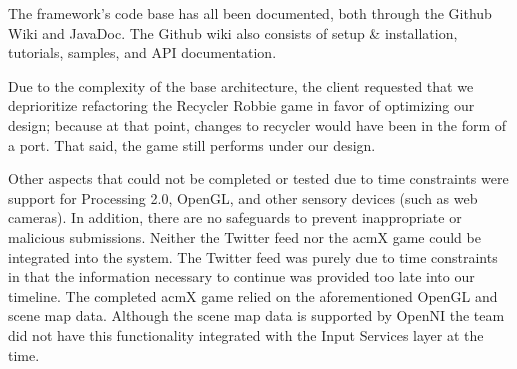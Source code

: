 \documentclass[11pt,letterpaper]{article}
\begin{document}
	The framework's code base has all been documented, both through the Github 
	Wiki and JavaDoc. The Github wiki also consists of setup \& installation, 
	tutorials, samples, and API documentation.

	Due to the complexity of the base architecture, the client requested that 
	we deprioritize refactoring the Recycler Robbie game in favor of 
	optimizing our design; because at that point, changes to recycler would 
	have been in the form of a port. That said, the game still performs under 
	our design. 

	Other aspects that could not be completed or tested due to time 
	constraints were support for Processing 2.0, OpenGL, and other sensory 
	devices (such as web cameras). In addition, there are no safeguards to prevent 
	inappropriate or malicious submissions. Neither the Twitter feed nor the 
	acmX game could be integrated into the system. The Twitter feed was purely 
	due to time constraints in that the information necessary to continue was 
	provided too late into our timeline. The completed acmX game relied on the
	aforementioned OpenGL and scene map data.  Although the scene map data is
	supported by OpenNI the team did not have this functionality integrated with
	the Input Services layer at the time.

	\pagebreak
   
\end{document}
